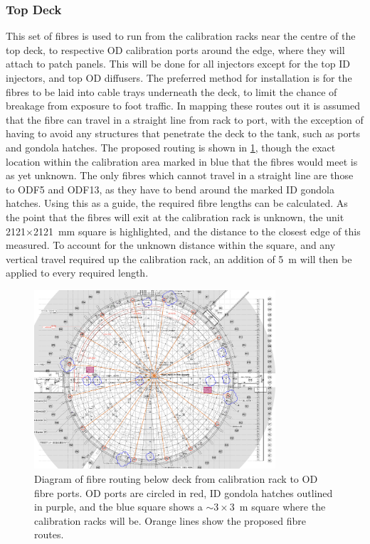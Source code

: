 \documentclass[a4paper,11pt]{article}
\let\oldsim\sim
\renewcommand{\sim}{{\oldsim}}
\begin{document}
\subsubsection{Top Deck}\label{sec:lengths:sub:len:sub:deck}

This set of fibres is used to run from the calibration racks near the centre of the top deck, to respective OD calibration ports around the edge, where they will attach to patch panels. This will be done for all injectors except for the top ID injectors, and top OD diffusers. The preferred method for installation is for the fibres to be laid into cable trays underneath the deck, to limit the chance of breakage from exposure to foot traffic. In mapping these routes out it is assumed that the fibre can travel in a straight line from rack to port, with the exception of having to avoid any structures that penetrate the deck to the tank, such as ports and gondola hatches. The proposed routing is shown in \cref{fig:deckFibreMap}, though the exact location within the calibration area marked in blue that the fibres would meet is as yet unknown. The only fibres which cannot travel in a straight line are those to ODF5 and ODF13, as they have to bend around the marked ID gondola hatches. Using this as a guide, the required fibre lengths can be calculated. As the point that the fibres will exit at the calibration rack is unknown, the unit 2121$\times$2121~mm square is highlighted, and the distance to the closest edge of this measured. To account for the unknown distance within the square, and any vertical travel required up the calibration rack, an addition of 5~m will then be applied to every required length. 
\begin{figure}[ht!]
\centering
\includegraphics[width=0.8\textwidth]{deckFibreMap}
\caption{Diagram of fibre routing below deck from calibration rack to OD fibre ports. OD ports are circled in red, ID gondola hatches outlined in purple, and the blue square shows a $\sim 3\times 3$~m square where the calibration racks will be. Orange lines show the proposed fibre routes.}\label{fig:deckFibreMap}
\end{figure}
\end{document}
